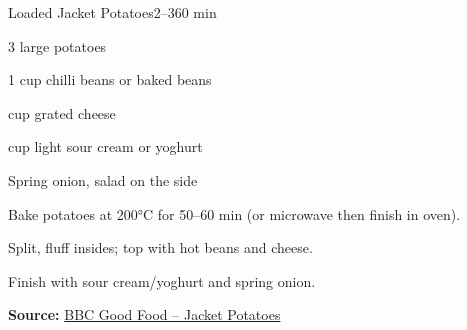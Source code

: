 \begin{recipebox}{Loaded Jacket Potatoes}{2--3}{60 min}
\begin{ingredients}
  \item 3 large potatoes
  \item 1 cup chilli beans or baked beans
  \item {} cup grated cheese
  \item {} cup light sour cream or yoghurt
  \item Spring onion, salad on the side
\end{ingredients}
\begin{method}
  \item Bake potatoes at 200°C for 50--60 min (or microwave then finish in oven).
  \item Split, fluff insides; top with hot beans and cheese.
  \item Finish with sour cream/yoghurt and spring onion.
\end{method}
\textbf{Source:} \href{https://www.bbcgoodfood.com/recipes/jacket-potatoes}{BBC Good Food – Jacket Potatoes}
\end{recipebox}
